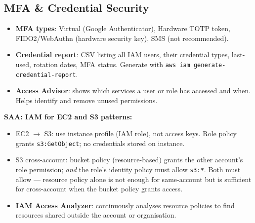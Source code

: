 \subsection{MFA \& Credential Security}

\begin{itemize}
  \item \textbf{MFA types}: Virtual (Google Authenticator), Hardware TOTP token, FIDO2/WebAuthn
        (hardware security key), SMS (not recommended).
  \item \textbf{Credential report}: CSV listing all IAM users, their credential types, last-used,
        rotation dates, MFA status. Generate with \texttt{aws iam generate-credential-report}.
  \item \textbf{Access Advisor}: shows which services a user or role has accessed and when.
        Helps identify and remove unused permissions.
\end{itemize}

\begin{saadepth}
\textbf{SAA: IAM for EC2 and S3 patterns:}
\begin{itemize}
  \item EC2 $\rightarrow$ S3: use instance profile (IAM role), not access keys. Role policy
        grants \texttt{s3:GetObject}; no credentials stored on instance.
  \item S3 cross-account: bucket policy (resource-based) grants the other account's role
        permission; \emph{and} the role's identity policy must allow \texttt{s3:*}.
        Both must allow --- resource policy alone is not enough for same-account but is
        sufficient for cross-account when the bucket policy grants access.
  \item \textbf{IAM Access Analyzer}: continuously analyses resource policies to find
        resources shared outside the account or organisation.
\end{itemize}
\end{saadepth}

